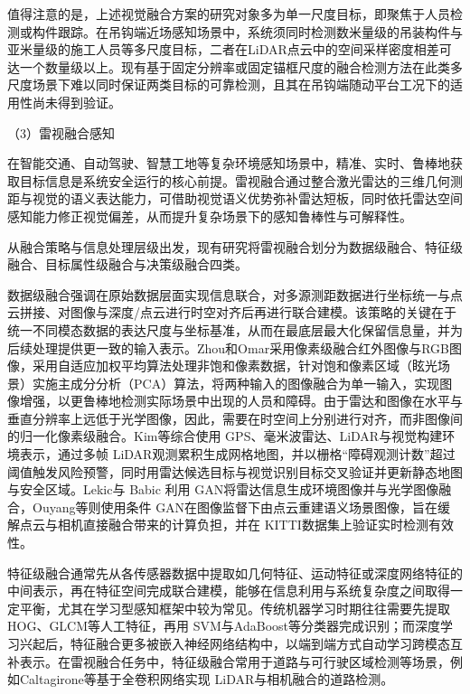 值得注意的是，上述视觉融合方案的研究对象多为单一尺度目标，即聚焦于人员检测或构件跟踪。在吊钩端近场感知场景中，系统须同时检测数米量级的吊装构件与亚米量级的施工人员等多尺度目标，二者在LiDAR点云中的空间采样密度相差可达一个数量级以上。现有基于固定分辨率或固定锚框尺度的融合检测方法在此类多尺度场景下难以同时保证两类目标的可靠检测\cite{Kim2025MultiScale}，且其在吊钩端随动平台工况下的适用性尚未得到验证。

（3）雷视融合感知

在智能交通、自动驾驶、智慧工地等复杂环境感知场景中，精准、实时、鲁棒地获取目标信息是系统安全运行的核心前提。雷视融合通过整合激光雷达的三维几何测距与视觉的语义表达能力，可借助视觉语义优势弥补雷达短板，同时依托雷达空间感知能力修正视觉偏差，从而提升复杂场景下的感知鲁棒性与可解释性\cite{1,4}。

从融合策略与信息处理层级出发，现有研究将雷视融合划分为数据级融合、特征级融合、目标属性级融合与决策级融合四类\cite{PL2G5AIL}。

数据级融合强调在原始数据层面实现信息联合，对多源测距数据进行坐标统一与点云拼接、对图像与深度/点云进行时空对齐后再进行联合建模。该策略的关键在于统一不同模态数据的表达尺度与坐标基准，从而在最底层最大化保留信息量，并为后续处理提供更一致的输入表示。Zhou和Omar\cite{IPIVFMW7}采用像素级融合红外图像与RGB图像，采用自适应加权平均算法处理非饱和像素数据，针对饱和像素区域（眩光场景）实施主成分分析（PCA）算法，将两种输入的图像融合为单一输入，实现图像增强，以更鲁棒地检测实际场景中出现的人员和障碍。由于雷达和图像在水平与垂直分辨率上远低于光学图像\cite{PL2G5AIL}，因此，需要在时空间上分别进行对齐，而非图像间的归一化像素级融合。Kim等\cite{6VLQ22DN}综合使用 GPS、毫米波雷达、LiDAR与视觉构建环境表示，通过多帧 LiDAR观测累积生成网格地图，并以栅格“障碍观测计数”超过阈值触发风险预警，同时用雷达候选目标与视觉识别目标交叉验证并更新静态地图与安全区域。Lekic与 Babic\cite{6JL73W7F} 利用 GAN将雷达信息生成环境图像并与光学图像融合，Ouyang等\cite{9EZWD4IB}则使用条件 GAN在图像监督下由点云重建语义场景图像，旨在缓解点云与相机直接融合带来的计算负担，并在 KITTI数据集上验证实时检测有效性。

特征级融合通常先从各传感器数据中提取如几何特征、运动特征或深度网络特征的中间表示，再在特征空间完成联合建模，能够在信息利用与系统复杂度之间取得一定平衡，尤其在学习型感知框架中较为常见。传统机器学习时期往往需要先提取 HOG、GLCM等人工特征，再用 SVM与AdaBoost等分类器完成识别；而深度学习兴起后，特征融合更多被嵌入神经网络结构中，以端到端方式自动学习跨模态互补表示\cite{PL2G5AIL}。在雷视融合任务中，特征级融合常用于道路与可行驶区域检测等场景，例如Caltagirone等\cite{2GFRMDA6}基于全卷积网络实现 LiDAR与相机融合的道路检测。

